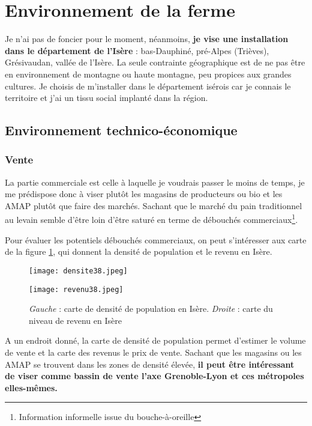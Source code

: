 \documentclass{article}
\begin{document}
\section{Environnement de la ferme}

Je n'ai pas de foncier pour le moment, néanmoins, \textbf{je vise une installation dans le département de l'Isère} : bas-Dauphiné, pré-Alpes (Trièves), Grésivaudan, vallée de l'Isère. La seule contrainte géographique est de ne pas être en environnement de montagne ou haute montagne, peu propices aux grandes cultures. Je choisis de m'installer dans le département isérois car je connais le territoire et j'ai un tissu social implanté dans la région.

\subsection{Environnement technico-économique}

\subsubsection*{Vente}

La partie commerciale est celle à laquelle je voudrais passer le moins de temps, je me prédispose donc à viser plutôt les magasins de producteurs ou bio et les AMAP plutôt que faire des marchés. Sachant que le marché du pain traditionnel au levain semble d'être loin d'être saturé en terme de débouchés commerciaux\footnote{Information informelle issue du bouche-à-oreille}. 

Pour évaluer les potentiels débouchés commerciaux, on peut s'intéresser aux carte de la figure \ref{fig:test}, qui donnent la densité de population et le revenu en Isère.

\begin{figure}[h!]
\centering
\begin{minipage}{.5\textwidth}
  \centering
  \texttt{[image: densite38.jpeg]}
\end{minipage}%
\begin{minipage}{.5\textwidth}
  \centering
  \texttt{[image: revenu38.jpeg]}
\end{minipage}
\caption{\textit{Gauche} : carte de densité de population en Isère. \textit{Droite} : carte du niveau de revenu en Isère}
\label{fig:test}
\end{figure}

A un endroit donné, la carte de densité de population permet d'estimer le volume de vente et la carte des revenus le prix de vente. Sachant que les magasins ou les AMAP se trouvent dans les zones de densité élevée, \textbf{il peut être intéressant de viser comme bassin de vente l'axe Grenoble-Lyon et ces métropoles elles-mêmes.}
\end{document}
